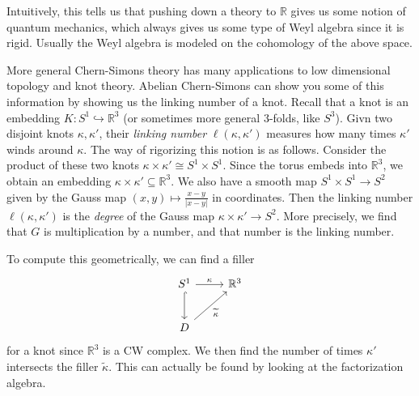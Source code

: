 Intuitively, this tells us that pushing down a theory to $\mathbb{R} $ gives us some notion of quantum mechanics, which always gives us some type of Weyl algebra since it is rigid. Usually the Weyl algebra is modeled on the cohomology of the above space.

\begin{remark}
	More general Chern-Simons theory has many applications to low dimensional topology and knot theory. Abelian Chern-Simons can show you some of this information by showing us the linking number of a knot. Recall that a knot is an embedding $K : S^1\hookrightarrow \mathbb{R} ^3$ (or sometimes more general 3-folds, like $S^3$). Givn two disjoint knots $\kappa ,\kappa'$, their \emph{linking number} $\ell(\kappa ,\kappa ')$ measures how many times $\kappa '$ winds around $\kappa $. The way of rigorizing this notion is as follows. Consider the product of these two knots $\kappa \times \kappa ' \cong  S^1 \times S^1$. Since the torus embeds into $\mathbb{R} ^3$, we obtain an embedding $\kappa \times \kappa ' \subseteq \mathbb{R} ^3$. We also have a smooth map $S^1\times S^1 \to S^2$ given by the Gauss map $(x,y)\mapsto \frac{x-y}{\left| x-y \right| } $ in coordinates. Then the linking number $\ell (\kappa ,\kappa ')$ is the \emph{degree} of the Gauss map $\kappa \times \kappa ' \to S^2$. More precisely, we find that $G$ is multiplication by a number, and that number is the linking number.

	To compute this geometrically, we can find a filler
	\[\begin{tikzcd}[row sep = 2.5em, column sep = 2.5em]
	S^1\ar[hook, d] \ar[" \kappa  ", r]  & \mathbb{R} ^3 \\
	D \ar[" \widetilde{\kappa }  "', ur]  & 
	\end{tikzcd}\]
	for a knot since $\mathbb{R} ^3$ is a CW complex. We then find the number of times $\kappa '$ intersects the filler $\widetilde{\kappa } $. This can actually be found by looking at the factorization algebra.
\end{remark}

